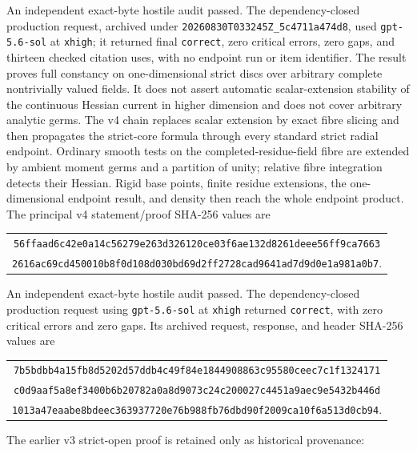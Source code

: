 An independent exact-byte hostile audit passed.  The dependency-closed
production request, archived under
\nolinkurl{20260830T033245Z_5c4711a474d8}, used
\texttt{gpt-5.6-sol} at \texttt{xhigh}; it returned final
\texttt{correct}, zero critical errors, zero gaps, and thirteen checked
citation uses, with no endpoint run or item identifier.  The result proves
full constancy on one-dimensional strict discs over arbitrary complete
nontrivially valued fields.  It does not assert automatic scalar-extension
stability of the continuous Hessian current in higher dimension and does
not cover arbitrary analytic germs.
The v4 chain
replaces scalar extension by exact fibre slicing and then propagates the
strict-core formula through every standard strict radial endpoint.  Ordinary
smooth tests on the completed-residue-field fibre are extended by ambient
moment germs and a partition of unity; relative fibre integration detects
their Hessian.  Rigid base points, finite residue extensions, the
one-dimensional endpoint result, and density then reach the whole endpoint
product.  The principal v4 statement/proof SHA-256 values are
\begin{center}
\small
\begin{tabular}{@{}c@{}}
\nolinkurl{56ffaad6c42e0a14c56279e263d326120ce03f6ae132d8261deee56ff9ca7663}\\
\nolinkurl{2616ac69cd450010b8f0d108d030bd69d2ff2728cad9641ad7d9d0e1a981a0b7}.
\end{tabular}
\end{center}
An independent exact-byte hostile audit passed.  The dependency-closed
production request using \texttt{gpt-5.6-sol} at \texttt{xhigh} returned
\texttt{correct}, with zero critical errors and zero gaps.  Its archived
request, response, and header SHA-256 values are
\begin{center}
\small
\begin{tabular}{@{}c@{}}
\nolinkurl{7b5bdbb4a15fb8d5202d57ddb4c49f84e1844908863c95580ceec7c1f1324171}\\
\nolinkurl{c0d9aaf5a8ef3400b6b20782a0a8d9073c24c200027c4451a9aec9e5432b446d}\\
\nolinkurl{1013a47eaabe8bdeec363937720e76b988fb76dbd90f2009ca10f6a513d0cb94}.
\end{tabular}
\end{center}
The earlier v3 strict-open proof is retained only as historical provenance:
